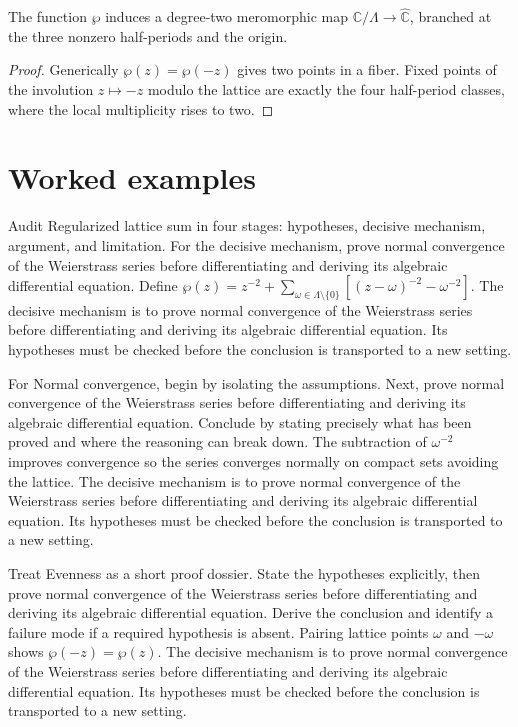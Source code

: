 \begin{theorem}\label{thm:iv29-04}
The function $\wp$ induces a degree-two meromorphic map $\mathbb C/\Lambda\to\widehat{\mathbb C}$, branched at the three nonzero half-periods and the origin.
\begin{proof}
Generically $\wp(z)=\wp(-z)$ gives two points in a fiber. Fixed points of the involution $z\mapsto-z$ modulo the lattice are exactly the four half-period classes, where the local multiplicity rises to two.
\end{proof}
\end{theorem}

\section{Worked examples}

\begin{example}\label{ex:iv29-worked-01}
Audit Regularized lattice sum in four stages: hypotheses, decisive mechanism, argument, and limitation. For the decisive mechanism, prove normal convergence of the Weierstrass series before differentiating and deriving its algebraic differential equation. Define $\wp(z)=z^{-2}+\sum_{\omega\in\Lambda\setminus\{0\}}[(z-\omega)^{-2}-\omega^{-2}]$. The decisive mechanism is to prove normal convergence of the Weierstrass series before differentiating and deriving its algebraic differential equation. Its hypotheses must be checked before the conclusion is transported to a new setting.
\end{example}

\begin{example}\label{ex:iv29-worked-02}
For Normal convergence, begin by isolating the assumptions. Next, prove normal convergence of the Weierstrass series before differentiating and deriving its algebraic differential equation. Conclude by stating precisely what has been proved and where the reasoning can break down. The subtraction of $\omega^{-2}$ improves convergence so the series converges normally on compact sets avoiding the lattice. The decisive mechanism is to prove normal convergence of the Weierstrass series before differentiating and deriving its algebraic differential equation. Its hypotheses must be checked before the conclusion is transported to a new setting.
\end{example}

\begin{example}\label{ex:iv29-worked-03}
Treat Evenness as a short proof dossier. State the hypotheses explicitly, then prove normal convergence of the Weierstrass series before differentiating and deriving its algebraic differential equation. Derive the conclusion and identify a failure mode if a required hypothesis is absent. Pairing lattice points $\omega$ and $-\omega$ shows $\wp(-z)=\wp(z)$. The decisive mechanism is to prove normal convergence of the Weierstrass series before differentiating and deriving its algebraic differential equation. Its hypotheses must be checked before the conclusion is transported to a new setting.
\end{example}

